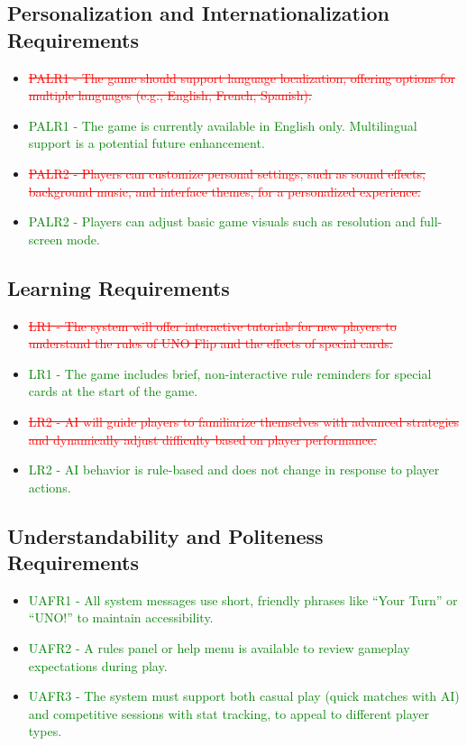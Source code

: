 \documentclass[12pt]{article}
\newcommand{\removed}[1]{\textcolor{red}{\sout{#1}}}
\newcommand{\added}[1]{\textcolor{green}{#1}}
\begin{document}
\subsection{Personalization and Internationalization Requirements}
\begin{itemize}
    \item \removed{PALR1 - The game should support language localization, offering options for multiple languages (e.g., English, French, Spanish).}
    \item \added{PALR1 - The game is currently available in English only. Multilingual support is a potential future enhancement.}
    \item \removed{PALR2 - Players can customize personal settings, such as sound effects, background music, and interface themes, for a personalized experience.}
    \item \added{PALR2 - Players can adjust basic game visuals such as resolution and full-screen mode.}
\end{itemize}

\subsection{Learning Requirements}
\begin{itemize}
    \item \removed{LR1 - The system will offer interactive tutorials for new players to understand the rules of UNO Flip and the effects of special cards.}
    \item \added{LR1 - The game includes brief, non-interactive rule reminders for special cards at the start of the game.}
    \item \removed{LR2 - AI will guide players to familiarize themselves with advanced strategies and dynamically adjust difficulty based on player performance.}
    \item \added{LR2 - AI behavior is rule-based and does not change in response to player actions.}
\end{itemize}

\subsection{Understandability and Politeness Requirements}
\begin{itemize}
    \item \added{UAFR1 - All system messages use short, friendly phrases like “Your Turn” or “UNO!” to maintain accessibility.}
    \item \added{UAFR2 - A rules panel or help menu is available to review gameplay expectations during play.}
    \item \added{UAFR3 - The system must support both casual play (quick matches with AI) and competitive sessions with stat tracking, to appeal to different player types.}

\end{itemize}
\end{document}
